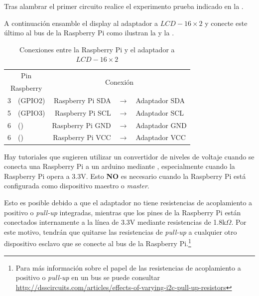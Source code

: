 \medskip
Tras alambrar el primer circuito realice el experimento prueba indicado en la .
\medskip

A continuación ensamble el display al adaptador \IIC{} a $LCD-16\times2$ y conecte este último al bus \IIC de la Raspberry Pi como ilustran la  y la .

\begin{table}
	\centering
	\caption{Conexiones \IIC entre la Raspberry Pi y el adaptador \IIC{} a $LCD-16\times2$}
	\label{tbl:pi-arduino-i2c} %
	\begin{tabularx}{0.8\linewidth}{cX rcl}
	\toprule
	\multicolumn{2}{c}{   Pin   } & \multicolumn{3}{c}{\multirow{2}{*}{Conexión}}  \\
	\multicolumn{2}{c}{Raspberry} & \multicolumn{3}{c}{}                           \\
	\midrule
	       3 & (GPIO2)            & Raspberry Pi SDA & $\rightarrow$ & Adaptador SDA \\
	       5 & (GPIO3)            & Raspberry Pi SCL & $\rightarrow$ & Adaptador SCL \\
	       6 & (\GND)             & Raspberry Pi GND & $\rightarrow$ & Adaptador GND \\
	       6 & (\GND)             & Raspberry Pi VCC & $\rightarrow$ & Adaptador VCC \\
	\bottomrule
	\end{tabularx}
\end{table}

Hay tutoriales que sugieren utilizar un convertidor de niveles de voltaje cuando se conecta una Raspberry Pi a un arduino mediante \IIC{}, especialmente cuando la Raspberry Pi opera a 3.3V. Esto \textbf{NO} es necesario cuando la Raspberry
Pi está configurada como dispositivo maestro o \emph{master}.

Esto es posible debido a que el adaptador no tiene resistencias de acoplamiento a positivo o \emph{pull-up} integradas, mientras que los pines \IIC de la Raspberry Pi están conectados internamente a la línea de 3.3V mediante resistencias de 1.8k$\Omega$.
Por este motivo, tendrán que quitarse las resistencias de \emph{pull-up} a cualquier otro dispositivo esclavo que se conecte al bus \IIC de la Raspberry Pi.\footnote{Para más información sobre el papel de las resistencias de acoplamiento a positivo o \emph{pull-up} en un bus \IIC se puede consultar \url{http://dsscircuits.com/articles/effects-of-varying-i2c-pull-up-resistors} }


